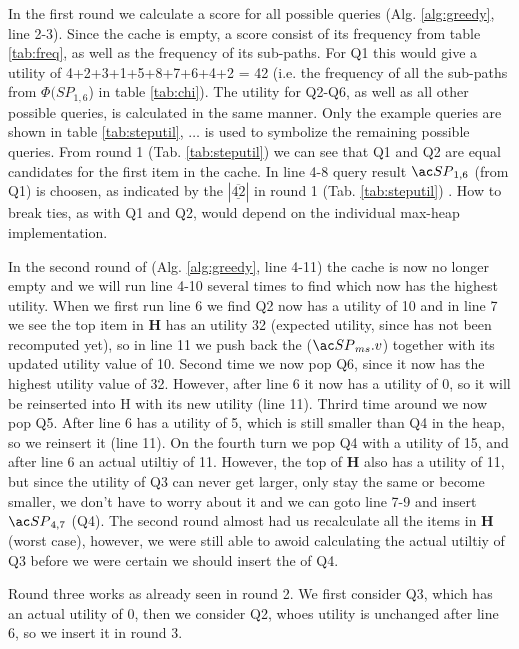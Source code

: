 In the first round we calculate a score for all possible queries (Alg. \ref{alg:greedy}, line 2-3). Since the cache is empty, a \spath score consist of its frequency from table \ref{tab:freq}, as well as the frequency of its sub-paths. For Q1 this would give a utility of 4+2+3+1+5+8+7+6+4+2 = 42 (i.e. the frequency of all the sub-paths from $\Phi(SP_{1,6}$) in table \ref{tab:chi}). The utility for Q2-Q6, as well as all other possible queries, is calculated in the same manner. Only the example queries are shown in table \ref{tab:steputil}, $\dots$ is used to symbolize the remaining possible queries. From round 1 (Tab. \ref{tab:steputil}) we can see that Q1 and Q2 are equal candidates for the first item in the cache. In line 4-8 query result $\spath_{1,6}$ (from Q1) is choosen, as indicated by the $| \underline{\overline{42}}|$ in round 1 (Tab. \ref{tab:steputil}) . How to break ties, as with Q1 and Q2, would depend on the individual max-heap implementation. 

In the second round of \salgo (Alg. \ref{alg:greedy}, line 4-11) the cache is now no longer empty and we will run line 4-10 several times to find which \spath now has the highest utility. When we first run line 6 we find Q2 now has a utility of 10 and in line 7 we see the top item in \textbf{H} has an utility 32 (expected utility, since has not been recomputed yet), so in line 11 we push back the \spath ($\spath_{ms}.v$) together with its updated utility value of 10. Second time we now pop Q6, since it now has the highest utility value of 32. However, after line 6 it now has a utility of 0, so it will be reinserted into H with its new utility (line 11). Thrird time around we now pop Q5. After line 6 has a utility of 5, which is still smaller than Q4 in the heap, so we reinsert it (line 11). On the fourth turn we pop Q4 with a utility of 15, and after line 6 an actual utiltiy of 11. However, the top of \textbf{H} also has a utility of 11, but since the utility of Q3 can never get larger, only stay the same or become smaller, we don't have to worry about it and we can goto line 7-9 and insert $\spath_{4,7}$ (Q4). The second round almost had us recalculate all the items in \textbf{H} (worst case), however, we were still able to awoid calculating the actual utiltiy of Q3 before we were certain we should insert the \spath of Q4.


Round three works as already seen in round 2. We first consider Q3, which has an actual utility of 0, then we consider Q2, whoes utility is unchanged after line 6, so we insert it in round 3.

